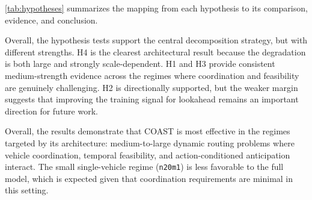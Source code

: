 \documentclass[conference]{IEEEtran}
\begin{document}
\autoref{tab:hypotheses} summarizes the mapping from each hypothesis to its comparison, evidence, and conclusion.

\begin{table}[t]
\centering
\caption{Hypothesis evaluation summary. Positive gaps indicate that the ablated variant incurs higher cost than COAST.}
\label{tab:hypotheses}
\footnotesize
{}
\end{table}

Overall, the hypothesis tests support the central decomposition strategy, but with different strengths. H4 is the clearest architectural result because the degradation is both large and strongly scale-dependent. H1 and H3 provide consistent medium-strength evidence across the regimes where coordination and feasibility are genuinely challenging. H2 is directionally supported, but the weaker margin suggests that improving the training signal for lookahead remains an important direction for future work.

Overall, the results demonstrate that COAST is most effective in the regimes targeted by its architecture: medium-to-large dynamic routing problems where vehicle coordination, temporal feasibility, and action-conditioned anticipation interact. The small single-vehicle regime (\texttt{n20m1}) is less favorable to the full model, which is expected given that coordination requirements are minimal in this setting.
\end{document}

